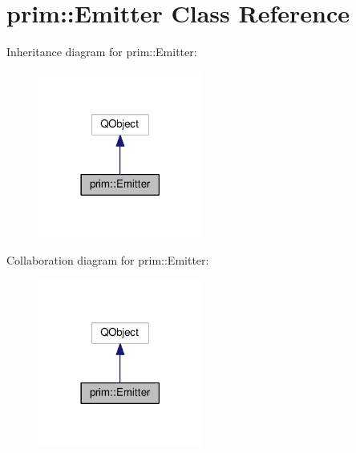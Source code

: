 \hypertarget{classprim_1_1Emitter}{}\section{prim\+:\+:Emitter Class Reference}
\label{classprim_1_1Emitter}


Inheritance diagram for prim\+:\+:Emitter\+:\nopagebreak
\begin{figure}[H]
\begin{center}
\leavevmode
\includegraphics[width=153pt]{classprim_1_1Emitter__inherit__graph}
\end{center}
\end{figure}


Collaboration diagram for prim\+:\+:Emitter\+:\nopagebreak
\begin{figure}[H]
\begin{center}
\leavevmode
\includegraphics[width=153pt]{classprim_1_1Emitter__coll__graph}
\end{center}
\end{figure}
